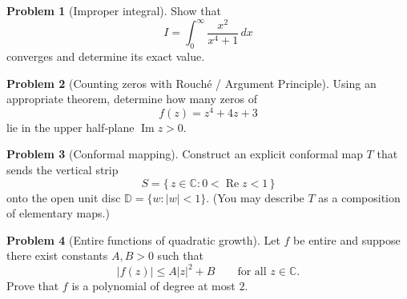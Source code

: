 \documentclass[12pt]{article}
\theoremstyle{definition} %
\newtheorem{problem}{Problem}
\theoremstyle{plain} %
\begin{document}
  \pagebreak
  \begin{problem}[Improper integral]
  Show that
  \[
    I=\int_{0}^{\infty}\frac{x^{2}}{x^{4}+1}\,dx
  \]
  converges and determine its exact value.
  \end{problem}
  
  \pagebreak
  \begin{problem}[Counting zeros with Rouché / Argument Principle]
  Using an appropriate theorem, determine how many zeros of
  \[
    f(z)=z^{4}+4z+3
  \]
  lie in the upper half‑plane $\operatorname{Im}z>0$.
  \end{problem}
  
  \pagebreak
  \begin{problem}[Conformal mapping]
  Construct an explicit conformal map $T$ that sends the vertical strip
  \[
    S=\bigl\{\,z\in\mathbb{C}:0<\operatorname{Re}z<1\,\bigr\}
  \]
  onto the open unit disc $\mathbb{D}=\{w:|w|<1\}$.
  (You may describe $T$ as a composition of elementary maps.)
  \end{problem}
  
  \pagebreak
  \begin{problem}[Entire functions of quadratic growth]
  Let $f$ be entire and suppose there exist constants $A,B>0$ such that
  \[
    |f(z)|\le A|z|^{2}+B
    \qquad\text{for all } z\in\mathbb{C}.
  \]
  Prove that $f$ is a polynomial of degree at most $2$.
  \end{problem}
\end{document}
